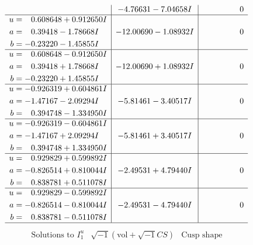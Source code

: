 \documentclass[1p]{elsarticle_modified}
\theoremstyle{definition}
\newcommand{\I}{\sqrt{-1}}
\begin{document}
$$\begin{array}{c|c|c}
 & -4.76631 - 7.04658 I & \phantom{-0.000000 } 0 \\ \hline\begin{aligned}
u &= \phantom{-}0.608648 + 0.912650 I \\
a &= \phantom{-}0.39418 - 1.78668 I \\
b &= -0.23220 - 1.45855 I\end{aligned}
 & -12.00690 - 1.08932 I & \phantom{-0.000000 } 0 \\ \hline\begin{aligned}
u &= \phantom{-}0.608648 - 0.912650 I \\
a &= \phantom{-}0.39418 + 1.78668 I \\
b &= -0.23220 + 1.45855 I\end{aligned}
 & -12.00690 + 1.08932 I & \phantom{-0.000000 } 0 \\ \hline\begin{aligned}
u &= -0.926319 + 0.604861 I \\
a &= -1.47167 - 2.09294 I \\
b &= \phantom{-}0.394748 - 1.334950 I\end{aligned}
 & -5.81461 - 3.40517 I & \phantom{-0.000000 } 0 \\ \hline\begin{aligned}
u &= -0.926319 - 0.604861 I \\
a &= -1.47167 + 2.09294 I \\
b &= \phantom{-}0.394748 + 1.334950 I\end{aligned}
 & -5.81461 + 3.40517 I & \phantom{-0.000000 } 0 \\ \hline\begin{aligned}
u &= \phantom{-}0.929829 + 0.599892 I \\
a &= -0.826514 + 0.810044 I \\
b &= \phantom{-}0.838781 + 0.511078 I\end{aligned}
 & -2.49531 + 4.79440 I & \phantom{-0.000000 } 0 \\ \hline\begin{aligned}
u &= \phantom{-}0.929829 - 0.599892 I \\
a &= -0.826514 - 0.810044 I \\
b &= \phantom{-}0.838781 - 0.511078 I\end{aligned}
 & -2.49531 - 4.79440 I & \phantom{-0.000000 } 0\\
 \hline 
 \end{array}$$\newpage$$\begin{array}{c|c|c}  
\text{Solutions to }I^u_{1}& \I (\text{vol} + \sqrt{-1}CS) & \text{Cusp shape}\\

\end{array}$$
\end{document}
